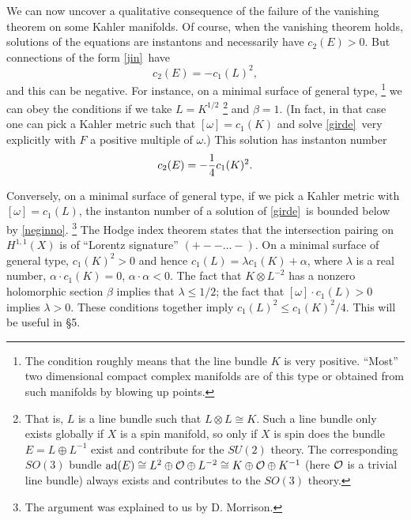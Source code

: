 \documentclass[12pt]{article}
\numberwithin{equation}{section}
\begin{document}
We can now uncover a qualitative consequence of the failure of
the vanishing theorem on some Kahler manifolds.  Of course, when
the vanishing theorem holds, solutions of the equations are instantons
and necessarily have $c_2(E)>0$.  But connections of the form \eqref{jin}\
have
\begin{equation}
  \label{goldfish}
  c_2(E)=-c_1(L)^2,
\end{equation}
and this can be negative.  For instance, on a minimal surface
of general type,
\footnote{The condition roughly means that the line bundle $K$ is
  very positive. ``Most'' two dimensional compact complex manifolds are
of this type or obtained from such manifolds by blowing up points.}
we can obey the conditions if we take $L=K^{1/2}$
\footnote{That is, $L$ is a line bundle such that $L\otimes L\cong
  K$. Such a line bundle only exists globally if $X$ is a spin
  manifold, so only if $X$ is spin does the bundle $E=L\oplus L^{-1}$
  exist and contribute for the $SU(2)$ theory.  The corresponding
  $SO(3)$ bundle ${\rm ad}(E) \cong L^{2}\oplus {\cal O}\oplus
  L^{-2}\cong K\oplus {\cal O}\oplus K^{-1}$ (here ${\cal O}$ is a
trivial line bundle) always exists and contributes to the $SO(3)$ theory.}
and $\beta=1$.  (In fact, in that case one can pick a Kahler metric
  such that $[\omega]=c_1(K)$ and solve \eqref{girde}\ very explicitly
with $F$ a positive multiple of $\omega$.) This solution
has instanton number
\begin{equation}
  \label{neginno}
  c_2(E)=-{1\over 4}c_1(K)^2.
\end{equation}

Conversely, on a minimal surface of general type, if we pick
a Kahler metric with $[\omega]=c_1(L)$, the instanton
number of a solution of \eqref{girde}\ is bounded below by \eqref{neginno}.
\footnote{The argument was explained to us by D. Morrison.}
The Hodge index theorem states that the intersection pairing on
$H^{1,1}(X)$ is of ``Lorentz signature'' $(+--\dots -)$.
On a minimal surface of general type, $c_1(K)^2>0$
and hence
$c_1(L)=\lambda c_1(K)+\alpha$,
where $\lambda $ is a real number,
$\alpha\cdot c_1(K)=0$, $\alpha\cdot \alpha<0$.  The fact
that $K\otimes L^{-2}$ has a nonzero holomorphic section $\beta$
implies that $\lambda\leq 1/2$; the fact that $[\omega ]\cdot c_1(L)>0$
implies $\lambda>0$.  These conditions together imply $c_1(L)^2\leq
c_1(K)^2/4$.  This will be useful in \S5.
\end{document}

